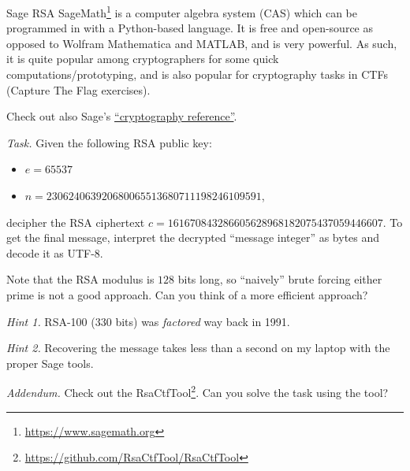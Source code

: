 \documentclass{practice}
\begin{document}
\begin{task}{Sage RSA}
  SageMath\footnote{\url{https://www.sagemath.org}} is a computer algebra system (CAS) which can be programmed in with a Python-based language.
  It is free and open-source as opposed to Wolfram Mathematica and MATLAB, and is very powerful.
  As such, it is quite popular among cryptographers for some quick computations/prototyping, and is also popular for cryptography tasks in CTFs (Capture The Flag exercises).

  Check out also Sage's \href{https://doc.sagemath.org/html/en/reference/cryptography/index.html}{\enquote{cryptography reference}}.

  \textit{Task.}
  Given the following RSA public key:
  \begin{itemize}
    \item $e = 65537$
    \item $n = 230624063920680065513680711198246109591$,
  \end{itemize}
  decipher the RSA ciphertext $c = 161670843286605628968182075437059446607$.
  To get the final message, interpret the decrypted \enquote{message integer} as bytes and decode it as UTF-8.

  Note that the RSA modulus is $128$ bits long, so \enquote{naively} brute forcing either prime is not a good approach.
  Can you think of a more efficient approach?
  
  \textit{Hint 1.}
  RSA-100 ($330$ bits) was \emph{factored} way back in 1991.

  \textit{Hint 2.}
  Recovering the message takes less than a second on my laptop with the proper Sage tools.

  \textit{Addendum.}
  Check out the RsaCtfTool\footnote{\url{https://github.com/RsaCtfTool/RsaCtfTool}}.
  Can you solve the task using the tool?
\end{task}
\end{document}
